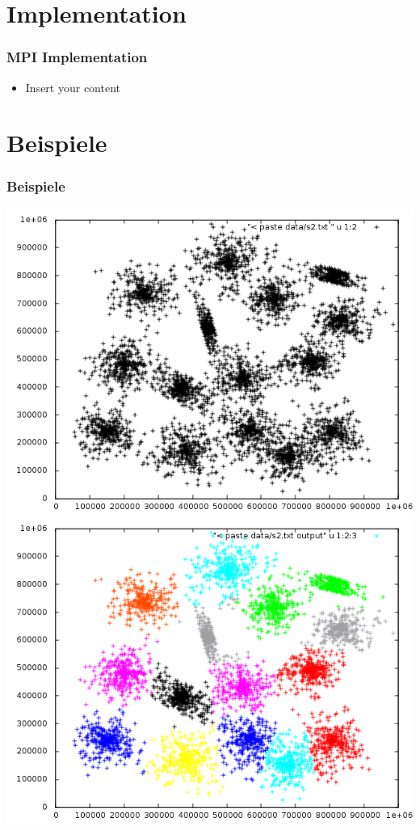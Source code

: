 \documentclass[10pt]{beamer}
\begin{document}
\section{Implementation}
\begin{frame}
	\frametitle{MPI Implementation}
	\begin{itemize}
		\item Insert your content
	\end{itemize}
\end{frame}

\section{Beispiele}
\begin{frame}
	\frametitle{Beispiele}
	\includegraphics[scale=0.34, keepaspectratio]{../output/pics/s2_black.png}
	\includegraphics[scale=0.34, keepaspectratio]{../output/pics/s2_colored.png}
\end{frame}
\end{document}
